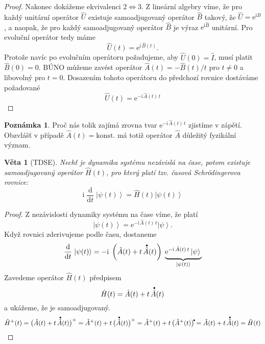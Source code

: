 \documentclass[10pt,a4paper]{article}
\newtheorem{theorem}{Věta}[section]
\theoremstyle{definition}
\newtheorem*{remark}{Poznámka}
\def\vph{\vphantom}
\newcommand{\const}[1]{\mathrm{#1}}
\newcommand{\dd}[2]{\frac{\const{d} #1}{\const{d} #2} \;}
\newcommand{\ket}[1]{\left| #1 \right>}
\newcommand{\e}[1]{\const{e}^{#1}}
\renewcommand{\i}{\const{i}}
\def\1{\hat{I}}
\newcommand{\bigdot}[1]{\accentset{\bullet}{#1}}
\def\konst{\mathrm{konst.}}
\begin{document}
\begin{proof}
    Nakonec dokážeme ekvivalenci $2 \Leftrightarrow 3$. Z lineární algebry víme, že pro každý unitární operátor $\hat U$ existuje samoadjugovaný operátor $\hat B$ takový, že $\hat U = \e{ \i \hat B}$, a naopak, že pro každý samoadjugovaný operátor $\hat B$ je výraz $\e{ \i \hat B}$ unitární. Pro evoluční operátor tedy máme
    \begin{equation*}
        \hat U(t) = \e{\i \, \hat B(t)}.
    \end{equation*}
    Protože navíc po evolučním operátoru požadujeme, aby $\hat U(0) = \1$, musí platit $\hat B(0) = 0$. BÚNO můžeme zavést operátor $\hat A(t) = - \hat B(t) / t$ pro $t \neq 0$ a libovolný pro $t=0$. Dosazením tohoto operátoru do předchozí rovnice dostáváme požadované
    \begin{equation*}
        \hat U(t) = \e{-\i \, \hat A(t) \, t}
    \end{equation*}
\end{proof}

\begin{remark}
Proč nás tolik zajímá zrovna tvar $\e{-\i \, \hat A(t) \, t}$ zjistíme v zápětí. Obzvlášť v případě $\hat A(t) = \konst$ má totiž operátor $\hat A$ důležitý fyzikální význam.
\end{remark}

\begin{theorem}[TDSE]
    Nechť je dynamika systému nezávislá na čase, potom existuje samoadjugovaný operátor $\hat H(t)$, pro který platí tzv. časová Schrödingerova rovnice:
    \begin{equation*}
        \i \; \dd{}{t} \! \ket{\psi(t)} = \hat H(t) \ket{\psi(t)}
    \end{equation*}
\end{theorem}
\begin{proof}
    Z nezávislosti dynamiky systému na čase víme, že platí
    \begin{equation*}
        \ket{\psi(t)} = \e{-\i \, \hat A(t) \, t} \ket{\psi}.
    \end{equation*}
    Když rovnici zderivujeme podle času, dostaneme
    \begin{equation*}
        \dd{}{t} \! \ket{\psi(t)} = -\i \; \left( \hat A(t) + t \, \bigdot{\hat A}(t) \right) \; \underbrace{ \e{-\i \, \hat A(t) \, t} \ket{\psi} \vph{\big|}}_{\ket{\psi(t)}}
    \end{equation*}
    Zavedeme operátor $\hat H(t)$ předpisem
    \begin{equation*}
        \hat H(t) = \hat A(t) + t \, \bigdot{\hat A}(t)
    \end{equation*}
    a ukážeme, že je samoadjugovaný.
    \begin{equation*}
        \hat H^+(t)
        = \big( \hat A(t) + t \, \bigdot{\hat A}(t) \big)^+
        = \hat A^+(t) + t \, \big(\bigdot{\hat A}(t) \big)^+
        = \hat A^+(t) + t \, \big(\hat A^+(t) \big)^{\bigdot{}}
        = \hat A(t) + t \, \bigdot{\hat A}(t)
        = \hat H(t)
    \end{equation*}
\end{proof}
\end{document}
